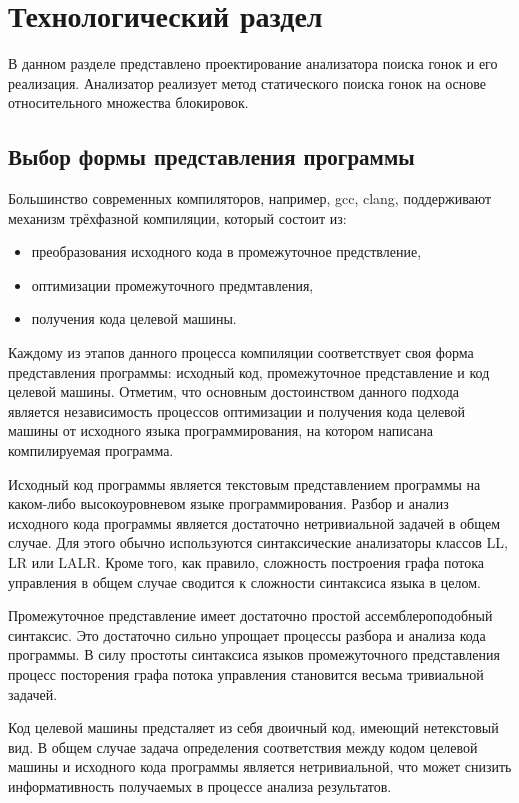 \chapter{Технологический раздел}
\label{cha:impl}

В данном разделе представлено проектирование анализатора поиска гонок и его реализация. Анализатор реализует метод статического поиска гонок на основе относительного множества блокировок.

\section{Выбор формы представления программы}

Большинство современных компиляторов, например, gcc, clang, поддерживают механизм трёхфазной компиляции, который состоит из:
\begin{itemize}
  \item преобразования исходного кода в промежуточное предствление,
  \item оптимизации промежуточного предмтавления,
  \item получения кода целевой машины.
\end{itemize}
Каждому из этапов данного процесса компиляции соответствует своя форма представления программы: исходный код, промежуточное представление и код целевой машины. Отметим, что основным достоинством данного подхода является независимость процессов оптимизации и получения кода целевой машины от исходного языка программирования, на котором написана компилируемая программа. 

Исходный код программы является текстовым представлением программы на каком-либо высокоуровневом языке программирования. Разбор и анализ исходного кода программы является достаточно нетривиальной задачей в общем случае. Для этого обычно используются синтаксические анализаторы классов LL, LR или LALR. Кроме того, как правило, сложность построения графа потока управления в общем случае сводится к сложности синтаксиса языка в целом.

Промежуточное представление имеет достаточно простой ассемблероподобный синтаксис. Это достаточно сильно упрощает процессы разбора и анализа кода программы. В силу простоты синтаксиса языков промежуточного представления процесс посторения графа потока управления становится весьма тривиальной задачей.

Код целевой машины предсталяет из себя двоичный код, имеющий нетекстовый вид. В общем случае задача определения соответствия между кодом целевой машины и исходного кода программы является нетривиальной, что может снизить информативность получаемых в процессе анализа результатов.

